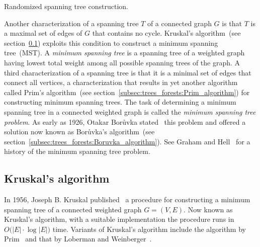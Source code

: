 \begin{algorithm}[!htpb]

\caption{Randomized spanning tree construction.}
\label{alg:trees_forests:randomized_spanning_tree_construction}
\end{algorithm}

Another characterization of a spanning tree $T$ of a connected graph
$G$ is that $T$ is a maximal set of edges of $G$ that contains no
cycle. Kruskal's algorithm~(see
section~\ref{subsec:trees_forests:Kruskal_algorithm}) exploits this
condition to construct a minimum spanning tree~(MST). A
\emph{minimum spanning tree} is a
spanning tree of a weighted graph having lowest total weight among all
possible spanning trees of the graph. A third characterization of a
spanning tree is that it is a minimal set of edges that connect all
vertices, a characterization that results in yet another algorithm
called Prim's algorithm~(see
section~\ref{subsec:trees_forests:Prim_algorithm}) for constructing
minimum spanning trees. The task of determining a minimum spanning
tree in a connected weighted graph is called the
\emph{minimum spanning tree problem}. As early as 1926, Otakar
Bor\r{u}vka stated~\cite{Boruvka1926a,Boruvka1926b} this problem and
offered a solution now known as Bor\r{u}vka's algorithm~(see
section~\ref{subsec:trees_forests:Boruvka_algorithm}). See Graham and
Hell~\cite{GrahamHell1985} for a history of the minimum spanning tree
problem.



\subsection{Kruskal's algorithm}
\label{subsec:trees_forests:Kruskal_algorithm}

In 1956, Joseph B. Kruskal published~\cite{Kruskal1956} a procedure
for constructing a minimum spanning tree of a connected weighted
graph $G = (V,E)$. Now known as Kruskal's algorithm, with a suitable
implementation the procedure runs in $O\big(|E| \cdot \log |E|\big)$
time. Variants of Kruskal's algorithm include the algorithm by
Prim~\cite{Prim1957} and that by Loberman and
Weinberger~\cite{LobermanWeinberger1957}.

